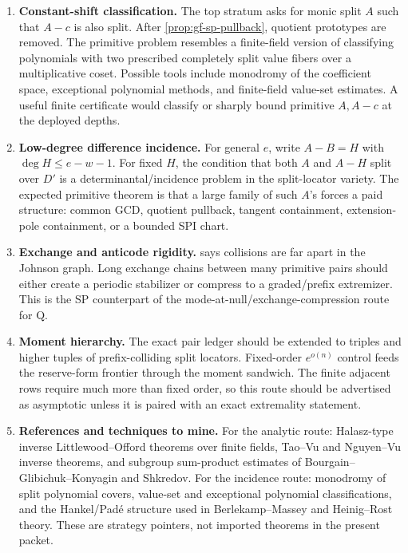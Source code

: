 \begin{enumerate}[label=\textup{SP\arabic*.},leftmargin=*]
\item \textbf{Constant-shift classification.}
The top stratum asks for monic split \(A\) such that \(A-c\) is also split.
After \cref{prop:gf-sp-pullback}, quotient prototypes are removed.  The
primitive problem resembles a finite-field version of classifying polynomials
with two prescribed completely split value fibers over a multiplicative coset.
Possible tools include monodromy of the coefficient space, exceptional
polynomial methods, and finite-field value-set estimates.  A useful finite
certificate would classify or sharply bound primitive \(A,A-c\) at the deployed
depths.

\item \textbf{Low-degree difference incidence.}
For general \(e\), write \(A-B=H\) with \(\deg H\le e-w-1\).  For fixed
\(H\), the condition that both \(A\) and \(A-H\) split over \(D'\) is a
determinantal/incidence problem in the split-locator variety.  The expected
primitive theorem is that a large family of such \(A\)'s forces a paid
structure: common GCD, quotient pullback, tangent containment, extension-pole
containment, or a bounded SPI chart.

\item \textbf{Exchange and anticode rigidity.}
 says collisions are far apart in the Johnson graph.
Long exchange chains between many primitive pairs should either create a
periodic stabilizer or compress to a graded/prefix extremizer.  This is the SP
counterpart of the mode-at-null/exchange-compression route for Q.

\item \textbf{Moment hierarchy.}
The exact pair ledger should be extended to triples and higher tuples of
prefix-colliding split locators.  Fixed-order \(e^{o(n)}\) control feeds the
reserve-form frontier through the moment sandwich.  The finite adjacent rows
require much more than fixed order, so this route should be advertised as
asymptotic unless it is paired with an exact extremality statement.

\item \textbf{References and techniques to mine.}
For the analytic route: Halasz-type inverse Littlewood--Offord theorems over
finite fields, Tao--Vu and Nguyen--Vu inverse theorems, and subgroup
sum-product estimates of Bourgain--Glibichuk--Konyagin and Shkredov.  For the
incidence route: monodromy of split polynomial covers, value-set and exceptional
polynomial classifications, and the Hankel/Padé structure used in
Berlekamp--Massey and Heinig--Rost theory.  These are strategy pointers, not
imported theorems in the present packet.
\end{enumerate}

